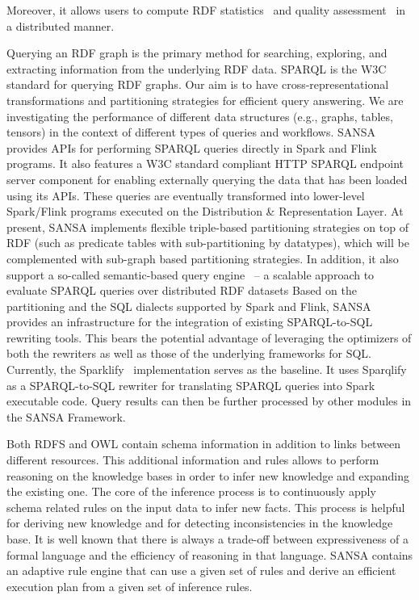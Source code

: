 Moreover, it allows users to compute RDF statistics~\cite{sejdiu-2018-dist-lod-stats-iswc} and quality assessment~\cite{sejdiu-2019-sansa-dist-quality-assessment-iswc} in a distributed manner.


Querying an RDF graph is the primary method for searching, exploring, and extracting information from the underlying RDF data.
\gls{SPARQL} is the \gls{W3C} standard for querying RDF graphs.
Our aim is to have cross-representational transformations and partitioning strategies for efficient query answering. We are investigating the performance of different data structures (e.g., graphs, tables, tensors) in the context of different types of queries and workflows.
SANSA provides APIs for performing \gls{SPARQL} queries directly in Spark and Flink programs.
It also features a W3C standard compliant HTTP SPARQL endpoint server component for enabling externally querying the data that has been loaded using its APIs. These queries are eventually transformed into lower-level Spark/Flink programs executed on the Distribution \& Representation Layer.
At present, SANSA implements flexible triple-based partitioning strategies on top of RDF (such as predicate tables with sub-partitioning by datatypes), which will be complemented with sub-graph based partitioning strategies.
In addition, it also support a so-called semantic-based query engine~\cite{sejdiu-2019-sansa-semantic-based-semantics} -- a scalable approach to evaluate SPARQL queries over distributed RDF datasets
Based on the partitioning and the SQL dialects supported by Spark and Flink, SANSA provides an infrastructure for the integration of existing SPARQL-to-SQL rewriting tools. 
This bears the potential advantage of leveraging the optimizers of both the rewriters as well as those of the underlying frameworks for SQL.
Currently, the Sparklify~\cite{2019-sansa-sparklify-iswc} implementation serves as the baseline.
It uses Sparqlify as a SPARQL-to-SQL rewriter for translating SPARQL queries into Spark executable code.
Query results can then be further processed by other modules in the SANSA Framework.

Both RDFS and OWL contain schema information in addition to links between different resources. 
This additional information and rules allows to perform reasoning on the knowledge bases in order to infer new knowledge and expanding the existing one. 
The core of the inference process is to continuously apply schema related rules on the input data to infer new facts. 
This process is helpful for deriving new knowledge and for detecting inconsistencies in the knowledge base.
It is well known that there is always a trade-off between expressiveness of a formal language and the efficiency of reasoning in that language. 
SANSA contains an adaptive rule engine that can use a given set of rules and derive an efficient execution plan from a given set of inference rules.


